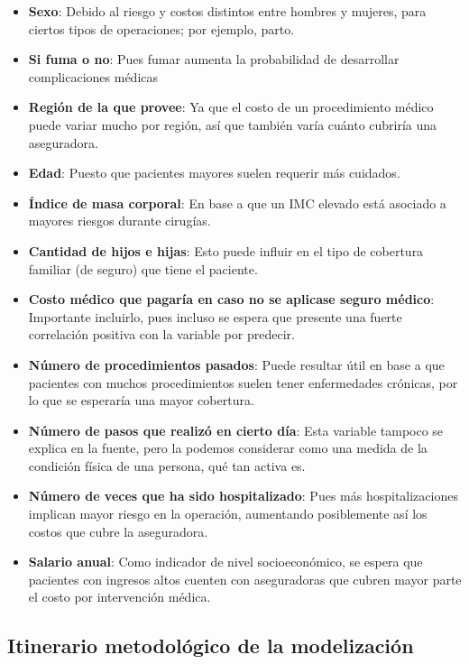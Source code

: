 \documentclass[
  letterpaper,
  DIV=11,
  numbers=noendperiod]{scrartcl}
\providecommand{\tightlist}{%
  \setlength{\itemsep}{0pt}\setlength{\parskip}{0pt}}\usepackage{longtable,booktabs,array}
\begin{document}
\begin{itemize}
\tightlist
\item
  \textbf{Sexo}: Debido al riesgo y costos distintos entre hombres y
  mujeres, para ciertos tipos de operaciones; por ejemplo, parto.
\item
  \textbf{Si fuma o no}: Pues fumar aumenta la probabilidad de
  desarrollar complicaciones médicas
\item
  \textbf{Región de la que provee}: Ya que el costo de un procedimiento
  médico puede variar mucho por región, así que también varía cuánto
  cubriría una aseguradora.
\item
  \textbf{Edad}: Puesto que pacientes mayores suelen requerir más
  cuidados.
\item
  \textbf{Índice de masa corporal}: En base a que un IMC elevado está
  asociado a mayores riesgos durante cirugías.
\item
  \textbf{Cantidad de hijos e hijas}: Esto puede influir en el tipo de
  cobertura familiar (de seguro) que tiene el paciente.
\item
  \textbf{Costo médico que pagaría en caso no se aplicase seguro
  médico}: Importante incluirlo, pues incluso se espera que presente una
  fuerte correlación positiva con la variable por predecir.
\item
  \textbf{Número de procedimientos pasados}: Puede resultar útil en base
  a que pacientes con muchos procedimientos suelen tener enfermedades
  crónicas, por lo que se esperaría una mayor cobertura.
\item
  \textbf{Número de pasos que realizó en cierto día}: Esta variable
  tampoco se explica en la fuente, pero la podemos considerar como una
  medida de la condición física de una persona, qué tan activa es.
\item
  \textbf{Número de veces que ha sido hospitalizado}: Pues más
  hospitalizaciones implican mayor riesgo en la operación, aumentando
  posiblemente así los costos que cubre la aseguradora.
\item
  \textbf{Salario anual}: Como indicador de nivel socioeconómico, se
  espera que pacientes con ingresos altos cuenten con aseguradoras que
  cubren mayor parte el costo por intervención médica.
\end{itemize}

\subsection{Itinerario metodológico de la
modelización}\label{itinerario-metodoluxf3gico-de-la-modelizaciuxf3n}
\end{document}
